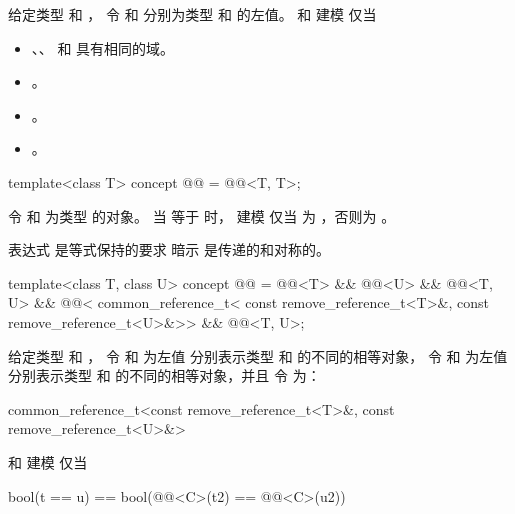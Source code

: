 \begin{itemdescr}
\pnum
给定类型  和 ，
令  和  分别为类型
 和
 的左值。
 和  建模
 仅当
\begin{itemize}
\item {}、、 和 
      具有相同的域。
\item {}。
\item {}。
\item {}。
\end{itemize}
\end{itemdescr}

\begin{itemdecl}
template<class T>
  concept @@ = @@<T, T>;
\end{itemdecl}

\begin{itemdescr}
\pnum
令  和  为类型  的对象。
当  等于
 时， 建模  仅当  为 ，否则为 。

\pnum
\begin{note}
表达式  是等式保持的要求
暗示 \tcode{==} 是传递的和对称的。
\end{note}
\end{itemdescr}

\begin{itemdecl}
template<class T, class U>
  concept @@ =
    @@<T> && @@<U> &&
    @@<T, U> &&
    @@<
      common_reference_t<
        const remove_reference_t<T>&,
        const remove_reference_t<U>&>> &&
    @@<T, U>;
\end{itemdecl}

\begin{itemdescr}
\pnum
给定类型  和 ，
令  和  为左值
分别表示类型  和
 的不同的相等对象，
令  和  为左值
分别表示类型  和
 的不同的相等对象，并且
令  为：
\begin{codeblock}
common_reference_t<const remove_reference_t<T>&, const remove_reference_t<U>&>
\end{codeblock}
 和  建模
 仅当
\begin{codeblock}
bool(t == u) == bool(@@<C>(t2) == @@<C>(u2))
\end{codeblock}
\end{itemdescr}

